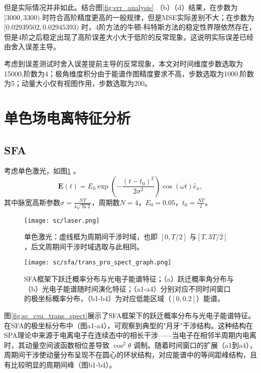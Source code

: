  但是实际情况并非如此。结合图\ref{fig:err_analysis} （b）（d）结果，在步数为$[3000, 3300)$ 时符合高阶精度更高的一般规律，但是MSE实际差别不大；在步数为$[0.02939502, 0.02945393)$ 时，4阶方法的牛顿-科特斯方法的稳定性界限依然存在，但是4阶之后稳定出现了高阶误差大小大于低阶的反常现象，这说明实际误差已经由舍入误差主导。

考虑到误差测试时舍入误差提前主导的反常现象，本文对时间维度步数选取为15000,阶数为4；极角维度积分由于能谱作图精度要求不高，步数选取为1000,阶数为5；动量大小仅有视图作用，步数选取为200。

%
\section{单色场电离特征分析}
\subsection{SFA}
考虑单色激光，如图\ref{fig:sc_laser} 。
\begin{equation}
	\mathbf{E}(t) = E_0 \exp\left(-\frac{(t - t_0)^2}{2\sigma^2}\right) \cos(\omega t) \hat e_x,
	\label{eq:sc_laser}
\end{equation}
其中脉宽高斯参数$\sigma = \frac{NT}{4\sqrt{\ln{2}}}$，周期数$N = 4$，$E_0 = 0.05$，$t_0 = \frac{NT}{2}$。

\begin{figure}[!htbp]  %
	\centering
	\texttt{[image: sc/laser.png]}
	\caption{单色激光：虚线框为周期间干涉时域，也即 $[0, T/2]$ 与$ [T, 3T/2]$ ，后文周期间干涉时域选取与此相同。}
	\label{fig:sc_laser}
\end{figure}

\begin{figure}[!htbp]  %
	\centering
	\texttt{[image: sc/sfa/trans\_pro\_spect\_graph.png]}
	\caption{SFA框架下跃迁概率分布与光电子能谱特征；（a）跃迁概率角分布与（b）光电子能谱随时间演化特征；（a1-a4）分别对应不同时间窗口的极坐标概率分布，（b1-b4）为对应低能区域（$[0, 0.2]$）能谱。}
	\label{fig:sc_sfa_trans_spect}
\end{figure}

图\ref{fig:sc_cva_trans_spect}展示了SFA框架下的跃迁概率分布与光电子能谱特征。在SFA的极坐标分布中（图a1-a4），可观察到典型的"月牙"干涉结构。这种结构在SPA理论中来源于电离电子在连续态中的相长干涉——当电子在相邻半周期内电离时，其动量空间波函数相位差导致  $\cos^2\theta$ 调制。随着时间窗口的扩展（a1到a4），周期间干涉使动量分布呈现不在圆心的环状结构，对应能谱中的等间距峰结构，且有比较明显的周期间峰（图b1-b4）。

